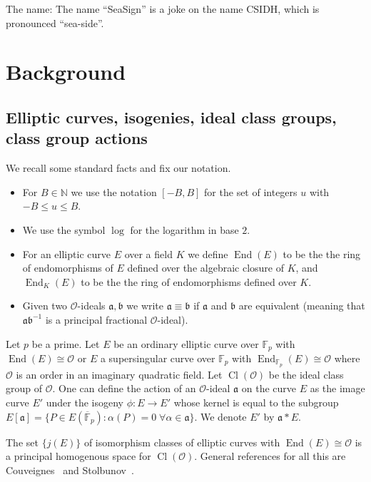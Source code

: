 \documentclass{llncs}
\newcommand{\F}{\mathbb{F}}
\newcommand{\Fpbar}{\overline{\mathbb{F}}_p}
\newcommand{\N}{\mathbb{N}}
\newcommand{\OO}{\mathcal{O}}
\DeclareMathOperator{\End}{End}
\DeclareMathOperator{\Cl}{Cl}
\renewcommand{\a}{\mathfrak{a}}
\renewcommand{\b}{\mathfrak{b}}
\begin{document}
The name: The name ``SeaSign'' is a joke on the name CSIDH, which is pronounced ``sea-side''.




\section{Background}

\subsection{Elliptic curves, isogenies, ideal class groups, class group actions}

We recall some standard facts and fix our notation.

\begin{itemize}
\item For $B \in \N$ we use the notation $[-B,B]$ for the set of integers $u$ with $-B \le u \le B$.
\item We use the symbol $\log$ for the logarithm in base $2$.

\item For an elliptic curve $E$ over a field $K$ we define $\End(E)$ to be the the ring of endomorphisms of $E$ defined over the algebraic closure of $K$, and $\End_K(E)$ to be the the ring of endomorphisms defined over $K$.
\item Given two $\OO$-ideals $\a, \b$ we write $\a \equiv \b$ if $\a$ and $\b$ are equivalent (meaning that $\a \b^{-1}$ is a principal fractional $\OO$-ideal). 
\end{itemize}


Let $p$ be a prime.
Let $E$ be an ordinary elliptic curve over $\F_p$ with $\End(E) \cong \OO$ or $E$ a supersingular curve over $\F_p$ with $\End_{\F_p}(E) \cong \OO$ where $\OO$ is an order in an imaginary quadratic field.
Let $\Cl(\OO )$ be the ideal class group of $\OO$.
One can define the action of an $\OO$-ideal $\a$ on the curve $E$ as the image curve $E'$ under the isogeny $\phi : E \to E'$ whose kernel is equal to the subgroup $E[ \a ] = \{ P \in E( \Fpbar ) : \alpha(P) = 0 \; \forall \alpha \in \a \}$.
We denote $E'$ by $\a * E$.

The set $\{ j(E) \}$ of isomorphism classes of elliptic curves with $\End(E) \cong \OO$ is a principal homogenous space for $\Cl(\OO )$.
General references for all this are Couveignes~\cite{Couv06}
and Stolbunov~\cite{Sto12}.
\end{document}
